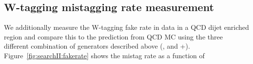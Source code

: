 %
  

\subsection{W-tagging mistagging rate measurement} 

We additionally measure the W-tagging fake rate in data in a QCD dijet enriched region and compare this to the prediction from QCD MC using the three different combination of generators described above (\HERWIG{++}, \PYTHIA and \MADGRAPH+\PYTHIA).
Figure~\ref{fig:searchII:fakerate} shows the mistag rate as a function of \PT

